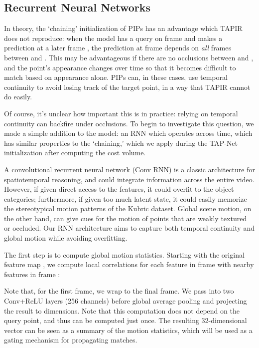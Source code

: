 \documentclass[10pt,twocolumn,letterpaper]{article}
\begin{document}
\subsection{Recurrent Neural Networks}
In theory, the `chaining' initialization of PIPs has an advantage which TAPIR does not reproduce: when the model has a query on frame  and makes a prediction at a later frame , the prediction at frame  depends on \textit{all} frames between  and .  This may be advantageous if there are no occlusions between  and , and the point's appearance changes over time so that it becomes difficult to match based on appearance alone.  PIPs can, in these cases, use temporal continuity to avoid losing track of the target point, in a way that TAPIR cannot do easily.

Of course, it's unclear how important this is in practice: relying on temporal continuity can backfire under occlusions.  To begin to investigate this question, we made a simple addition to the model: an RNN which operates across time, which has similar properties to the `chaining,' which we apply during the TAP-Net initialization after computing the cost volume.

A convolutional recurrent neural network (Conv RNN) is a classic architecture for spatiotemporal reasoning, and could integrate information across the entire video.  However, if given direct access to the features, it could overfit to the object categories; furthermore, if given too much latent state, it could easily memorize the stereotypical motion patterns of the Kubric dataset.  Global scene motion, on the other hand, can give cues for the motion of points that are weakly textured or occluded.  Our RNN architecture aims to capture both temporal continuity and global motion while avoiding overfitting.

The first step is to compute global motion statistics.  Starting with the original feature map , we compute local correlations  for each feature in frame  with nearby features in frame :



Note that, for the first frame, we wrap  to the final frame.  We pass  into two Conv+ReLU layers (256 channels) before global average pooling and projecting the result to  dimensions.  Note that this computation does not depend on the query point, and thus can be computed just once.  The resulting 32-dimensional vector can be seen as a summary of the motion statistics, which will be used as a gating mechanism for propagating matches.
\end{document}
